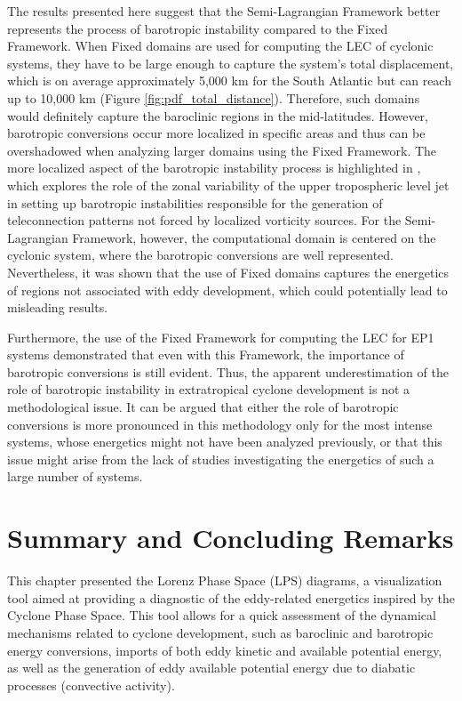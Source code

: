 The results presented here suggest that the Semi-Lagrangian Framework better represents the process of barotropic instability compared to the Fixed Framework. When Fixed domains are used for computing the LEC of cyclonic systems, they have to be large enough to capture the system's total displacement, which is on average approximately 5,000 km for the South Atlantic but can reach up to 10,000 km (Figure \ref{fig:pdf_total_distance}). Therefore, such domains would definitely capture the baroclinic regions in the mid-latitudes. However, barotropic conversions occur more localized in specific areas and thus can be overshadowed when analyzing larger domains using the Fixed Framework. The more localized aspect of the barotropic instability process is highlighted in \citet{grimm1995analysis}, which explores the role of the zonal variability of the upper tropospheric level jet in setting up barotropic instabilities responsible for the generation of teleconnection patterns not forced by localized vorticity sources. For the Semi-Lagrangian Framework, however, the computational domain is centered on the cyclonic system, where the barotropic conversions are well represented. Nevertheless, it was shown that the use of Fixed domains captures the energetics of regions not associated with eddy development, which could potentially lead to misleading results.


Furthermore, the use of the Fixed Framework for computing the LEC for EP1 systems demonstrated that even with this Framework, the importance of barotropic conversions is still evident. Thus, the apparent underestimation of the role of barotropic instability in extratropical cyclone development is not a methodological issue. It can be argued that either the role of barotropic conversions is more pronounced in this methodology only for the most intense systems, whose energetics might not have been analyzed previously, or that this issue might arise from the lack of studies investigating the energetics of such a large number of systems.

\section{Summary and Concluding Remarks}

This chapter presented the Lorenz Phase Space (LPS) diagrams, a visualization tool aimed at providing a diagnostic of the eddy-related energetics inspired by the \citet{hart2003cyclone} Cyclone Phase Space. This tool allows for a quick assessment of the dynamical mechanisms related to cyclone development, such as baroclinic and barotropic energy conversions, imports of both eddy kinetic and available potential energy, as well as the generation of eddy available potential energy due to diabatic processes (convective activity).

